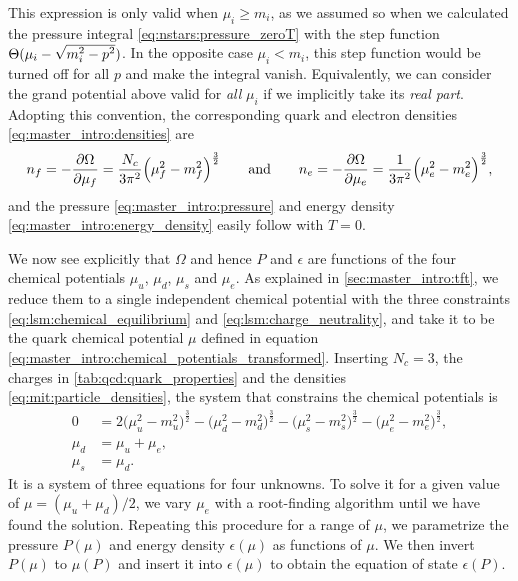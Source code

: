 This expression is only valid when $\mu_i \geq m_i$,
as we assumed so when we calculated the pressure integral \eqref{eq:nstars:pressure_zeroT} with the step function $\Theta(\mu_i-\sqrt{\smash[b]{m_i^2-p^2}})$.
In the opposite case $\mu_i < m_i$, this step function would be turned off for all $p$ and make the integral vanish.
Equivalently, we can consider the grand potential above valid for \emph{all} $\mu_i$ if we implicitly take its \emph{real part}.
Adopting this convention, the corresponding quark and electron densities \eqref{eq:master_intro:densities} are
\begin{equation}
	n_f = -\pdv{\Omega}{\mu_f} = \frac{N_c}{3 \pi^2} \Big( \mu_f^2 - m_f^2 \Big)^{\frac32}
	\qquad \text{and} \qquad
	n_e = -\pdv{\Omega}{\mu_e} = \frac{  1}{3 \pi^2} \Big( \mu_e^2 - m_e^2 \Big)^{\frac32},
\label{eq:mit:particle_densities}%
\end{equation}
and the pressure \eqref{eq:master_intro:pressure} and energy density \eqref{eq:master_intro:energy_density} easily follow with $T=0$.

We now see explicitly that $\Omega$ and hence $P$ and $\epsilon$ are functions of the four chemical potentials $\mu_u$, $\mu_d$, $\mu_s$ and $\mu_e$.
As explained in \cref{sec:master_intro:tft},
we reduce them to a single independent chemical potential with the three constraints \eqref{eq:lsm:chemical_equilibrium} and \eqref{eq:lsm:charge_neutrality},
and take it to be the quark chemical potential $\mu$ defined in equation \eqref{eq:master_intro:chemical_potentials_transformed}.
Inserting $N_c=3$, the charges in \cref{tab:qcd:quark_properties} and the densities \eqref{eq:mit:particle_densities},
the system that constrains the chemical potentials is
\begin{subequations}
\begin{align}
	0 &=
	2 \big(\mu_u^2-m_u^2\big)^\frac32
	- \big(\mu_d^2-m_d^2\big)^\frac32 
	- \big(\mu_s^2-m_s^2\big)^\frac32 
	- \big(\mu_e^2-m_e^2\big)^\frac32, \label{eq:mit:charge_neutrality_explicit} \\
	\mu_d &= \mu_u + \mu_e, \label{eq:mit:eos_system_2nd} \\
	\mu_s &= \mu_d. \label{eq:mit:eos_system_3rd}
\end{align}%
\label{eq:mit:eos_system}%
\end{subequations}%
It is a system of three equations for four unknowns.
To solve it for a given value of $\mu=(\mu_u+\mu_d)/2$,
we vary $\mu_e$ with a root-finding algorithm until we have found the solution.
Repeating this procedure for a range of $\mu$,
we parametrize the pressure $P(\mu)$ and energy density $\epsilon(\mu)$ as functions of $\mu$.
We then invert $P(\mu)$ to $\mu(P)$ and insert it into $\epsilon(\mu)$ to obtain the equation of state $\epsilon(P)$.


